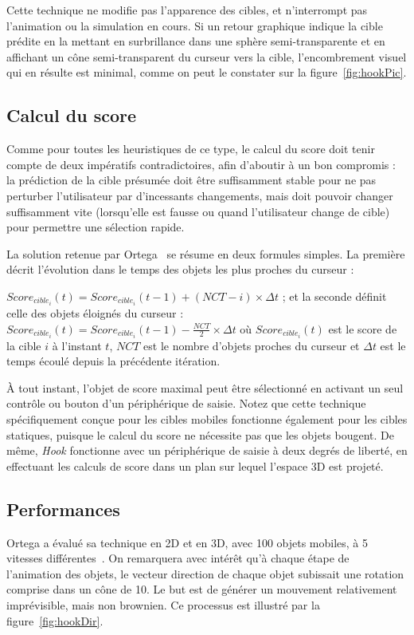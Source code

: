 	Cette technique ne modifie pas l'apparence des cibles, et n'interrompt pas l'animation ou la simulation en cours. Si un retour graphique indique la cible prédite en la mettant en surbrillance dans une sphère semi-transparente et en affichant un cône semi-transparent du curseur vers la cible, l'encombrement visuel qui en résulte est minimal, comme on peut le constater sur la figure~\ref{fig:hookPic}.
	
	\subsection{Calcul du score}
	Comme pour toutes les heuristiques de ce type, le calcul du score doit tenir compte de deux impératifs contradictoires, afin d'aboutir à un bon compromis : la prédiction de la cible présumée doit être suffisamment stable pour ne pas perturber l'utilisateur par d'incessants changements, mais doit pouvoir changer suffisamment vite (lorsqu'elle est fausse ou quand l'utilisateur change de cible) pour permettre une sélection rapide.
	
	La solution retenue par Ortega~\cite{ortega2013hook} se résume en deux formules simples. La première décrit l'évolution dans le temps des objets les plus proches du curseur :
	
	$Score_{cible_{i}}(t) = Score_{cible_{i}}(t-1) + (NCT - i) \times \Delta{}t$ ; et la seconde définit celle des objets éloignés du curseur : $Score_{cible_{i}}(t) = Score_{cible_{i}}(t-1) - \frac{NCT}{2} \times \Delta{}t$ où $Score_{cible_{i}}(t)$ est le score de la cible $i$ à l'instant $t$, $NCT$ est le nombre d'objets proches du curseur et $\Delta{}t$ est le temps écoulé depuis la précédente itération.
	
	À tout instant, l'objet de score maximal peut être sélectionné en activant un seul contrôle ou bouton d'un périphérique de saisie. Notez que cette technique spécifiquement conçue pour les cibles mobiles fonctionne également pour les cibles statiques, puisque le calcul du score ne nécessite pas que les objets bougent. De même, \emph{Hook} fonctionne avec un périphérique de saisie à deux degrés de liberté, en effectuant les calculs de score dans un plan sur lequel l'espace 3D est projeté.
	
	\subsection{Performances}
	Ortega a évalué sa technique en 2D et en 3D, avec 100 objets mobiles, à 5 vitesses différentes~\cite{ortega2013hook}. On remarquera avec intérêt qu'à chaque étape de l'animation des objets, le vecteur direction de chaque objet subissait une rotation comprise dans un cône de 10\textdegree. Le but est de générer un mouvement relativement imprévisible, mais non brownien. Ce processus est illustré par la figure~\ref{fig:hookDir}.
	
